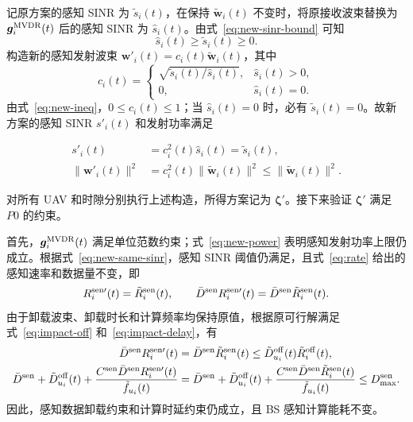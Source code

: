 \documentclass[11pt,a4paper]{ctexart}
\begin{document}
记原方案的感知 SINR 为 $\tilde s_i(t)$，在保持 $\tilde{\bm w}_i(t)$ 不变时，将原接收波束替换为 $\bm g_i^{\rm MVDR}(t)$ 后的感知 SINR 为 $\hat s_i(t)$。由式~\eqref{eq:new-sinr-bound} 可知
\begin{equation}\label{eq:new-ineq}
\hat s_i(t)\ge\tilde s_i(t)\ge0.
\end{equation}
构造新的感知发射波束 $\bm w'_i(t)=c_i(t)\tilde{\bm w}_i(t)$，其中
\begin{equation}\label{eq:new-scale}
c_i(t)=
\begin{cases}
\sqrt{\tilde s_i(t)/\hat s_i(t)},&\hat s_i(t)>0,\\
0,&\hat s_i(t)=0.
\end{cases}
\end{equation}
由式~\eqref{eq:new-ineq}，$0\le c_i(t)\le1$；当 $\hat s_i(t)=0$ 时，必有 $\tilde s_i(t)=0$。故新方案的感知 SINR $s'_i(t)$ 和发射功率满足
\begin{samepage}
\begin{align}\label{eq:new-same-sinr}
s'_i(t)&=c_i^2(t)\hat s_i(t)=\tilde s_i(t),\\
\|\bm w'_i(t)\|^2&=c_i^2(t)\|\tilde{\bm w}_i(t)\|^2\le\|\tilde{\bm w}_i(t)\|^2.\label{eq:new-power}
\end{align}
\end{samepage}
对所有 UAV 和时隙分别执行上述构造，所得方案记为 $\bm\zeta'$。接下来验证 $\bm\zeta'$ 满足 $P0$ 的约束。

首先，$\bm g_i^{\rm MVDR}(t)$ 满足单位范数约束；式~\eqref{eq:new-power} 表明感知发射功率上限仍成立。根据式~\eqref{eq:new-same-sinr}，感知 SINR 阈值仍满足，且式~\eqref{eq:rate} 给出的感知速率和数据量不变，即
\begin{equation}\label{eq:new-same-rate}
R_i^{\rm sen\prime}(t)=\tilde R_i^{\rm sen}(t),\qquad
\bar D^{\rm sen}R_i^{\rm sen\prime}(t)=\bar D^{\rm sen}\tilde R_i^{\rm sen}(t).
\end{equation}
由于卸载波束、卸载时长和计算频率均保持原值，根据原可行解满足式~\eqref{eq:impact-off} 和~\eqref{eq:impact-delay}，有
\begin{align}
\bar D^{\rm sen}R_i^{\rm sen\prime}(t)
&=\bar D^{\rm sen}\tilde R_i^{\rm sen}(t)
\le \tilde D_{u_i}^{\rm off}(t)\tilde R_i^{\rm off}(t),\label{eq:new-off}\\
\bar D^{\rm sen}+\tilde D_{u_i}^{\rm off}(t)
+\frac{C^{\rm sen}\bar D^{\rm sen}R_i^{\rm sen\prime}(t)}{\tilde f_{u_i}(t)}
&=\bar D^{\rm sen}+\tilde D_{u_i}^{\rm off}(t)
+\frac{C^{\rm sen}\bar D^{\rm sen}\tilde R_i^{\rm sen}(t)}{\tilde f_{u_i}(t)}
\le D_{\max}^{\rm sen}.\label{eq:new-delay}
\end{align}
因此，感知数据卸载约束和计算时延约束仍成立，且 BS 感知计算能耗不变。
\end{document}
